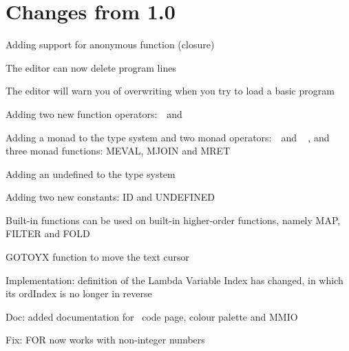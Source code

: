 \chapter{Changes from 1.0}

\begin{itemlist}
\item Adding support for anonymous function (closure)
\item The editor can now delete program lines
\item The editor will warn you of overwriting when you try to load a basic program
\item Adding two new function operators: \basicapply\ \,and\ \,\basiccompo
\item Adding a monad to the type system and two monad operators: \basicmbind\ \,and\ \,\basicmseq\ , and three monad functions: MEVAL, MJOIN and MRET
\item Adding an undefined to the type system
\item Adding two new constants: ID and UNDEFINED
\item Built-in functions can be used on built-in higher-order functions, namely MAP, FILTER and FOLD
\item GOTOYX function to move the text cursor
\item Implementation: definition of the Lambda Variable Index has changed, in which its ordIndex is no longer in reverse
\item Doc: added documentation for \thismachine\ code page, colour palette and MMIO
\item Fix: FOR now works with non-integer numbers
\end{itemlist}
